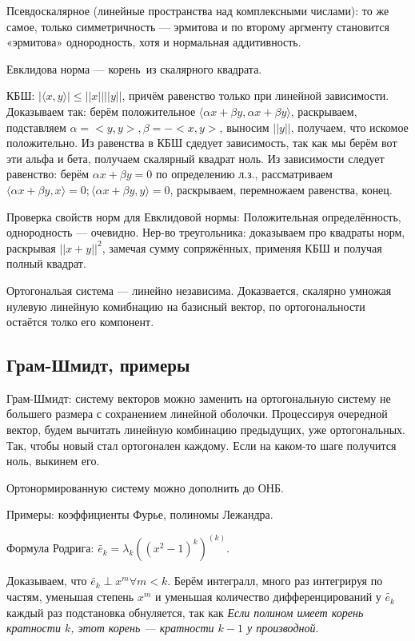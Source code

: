 \documentclass[12pt, a4paper]{article}
\begin{document}
Псевдоскалярное (линейные пространства над комплексными числами): 
то же самое, только симметричность — эрмитова и по второму аргменту становится 
«эрмитова» однородность, хотя и нормальная аддитивность.

Евклидова норма — корень из скалярного квадрата.

КБШ: $| \langle x, y \rangle | \leqslant ||x|| ||y||$, причём равенство только при линейной зависимости.
Доказываем так: берём положительное $\langle \alpha x + \beta y, \alpha x + \beta y \rangle$, раскрываем, подставляем
$\alpha = <y, y>, \beta = -<x, y>$, выносим $||y||$, получаем, что искомое положительно.
Из равенства в КБШ сдедует зависимость, так как мы берём вот эти альфа и бета, получаем скалярный квадрат ноль.
Из зависимости следует равенство: берём $\alpha x + \beta y = 0$ по определению л.з., 
рассматриваем $\langle\alpha x+\beta y, x\rangle=0; \langle\alpha x+\beta y, y\rangle=0$, раскрываем, перемножаем равенства, конец.

Проверка свойств норм для Евклидовой нормы:
Положительная определённость, однородность — очевидно. 
Нер-во треугольника: доказываем про квадраты норм, раскрывая $||x + y||^2$, замечая сумму сопряжённых, применяя КБШ и получая полный квадрат.

Ортогональая система — линейно независима. Доказвается, скалярно умножая нулевую линейную комибнацию на базисный вектор, 
по ортогональности остаётся толко его компонент. 

\subsection{Грам-Шмидт, примеры}

Грам-Шмидт: систему векторов можно заменить на ортогональную систему не большего размера с сохранением линейной оболочки.
Процессируя очередной вектор, будем вычитать линейную комбинацию предыдущих, уже ортогональных. Так, чтобы новый стал ортогонален каждому.
Если на каком-то шаге получится ноль, выкинем его.

Ортонормированную систему можно дополнить до ОНБ.

Примеры: коэффициенты Фурье, полиномы Лежандра.

Формула Родрига: $\tilde{e_k} = \lambda_k \left( (x^2 - 1)^k \right)^(k)$.

Доказываем, что $\tilde{e_k} \perp x^m \forall m < k$. Берём интегралл, много раз интегрируя по частям, уменьшая степень $x^m$ и уменьшая количество дифференцирований у $\tilde{e_k}$
каждый раз подстановка обнуляется, так как \textit{Если полином имеет корень кратности $k$, этот корень — кратности $k - 1$ у производной}.
\end{document}
